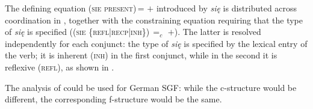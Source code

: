\documentclass[output=paper]{../langscibook}
\begin{document}
The defining equation \textsc{(\UP sie present)\,= $+$}
introduced by \emph{się} is distributed across coordination in
, together with the constraining
equation requiring that the type of \emph{się} is specified
(\textsc{(\UP sie \{refl|recp|inh\})\,$=_{c}$ $+$}). The
latter is resolved independently for each conjunct: the type of
\emph{się} is specified by the lexical entry of the verb; it is
inherent (\textsc{inh}) in the first conjunct, while in the second it is reflexive (\textsc{refl}),
as shown in .

\hspace*{-1mm}The analysis of \citet{PatejukPrzepiorkowski2015} could be used for German SGF: while
the c-structure would be different, the corresponding
f-structure would be the same.
\end{document}
